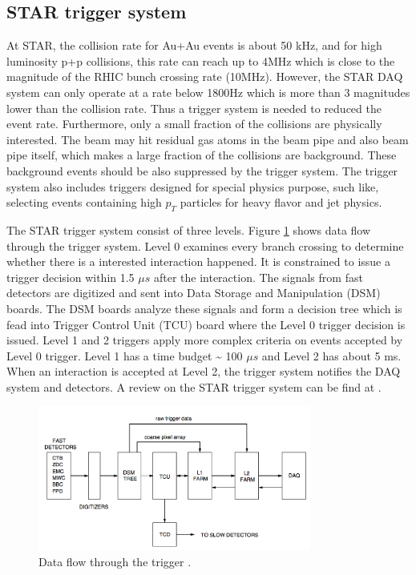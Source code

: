 \subsection{STAR trigger system}

At STAR, the collision rate for Au+Au events is about 50 kHz, and
for high luminosity p+p collisions, this rate can reach up to 4MHz
which is close to the magnitude of the RHIC bunch crossing rate (10MHz).
However, the STAR DAQ system can only operate at a rate below 1800Hz
which is more than 3 magnitudes lower than the collision rate. Thus
a trigger system is needed to reduced the event rate. Furthermore,
only a small fraction of the collisions are physically interested.
The beam may hit residual gas atoms in the beam pipe and also beam
pipe itself, which makes a large fraction of the collisions are background.
These background events should be also suppressed by the trigger system.
The trigger system also includes triggers designed for special physics
purpose, such like, selecting events containing high $p_{T}$ particles
for heavy flavor and jet physics.

The STAR trigger system consist of three levels. Figure \ref{fig:TriggerDataFlow}
shows data flow through the trigger system. Level 0 examines every
branch crossing to determine whether there is a interested interaction
happened. It is constrained to issue a trigger decision within 1.5
$\mu s$ after the interaction. The signals from fast detectors are
digitized and sent into Data Storage and Manipulation (DSM) boards.
The DSM boards analyze these signals and form a decision tree which
is fead into Trigger Control Unit (TCU) board where the Level 0 trigger
decision is issued. Level 1 and 2 triggers apply more complex criteria
on events accepted by Level 0 trigger. Level 1 has a time budget \textasciitilde{}
100 $\mu s$ and Level 2 has about 5 ms. When an interaction is accepted
at Level 2, the trigger system notifies the DAQ system and detectors.
A review on the STAR trigger system can be find at \cite{Bieser2003766}.

\begin{figure}
\begin{centering}
\includegraphics[width=0.8\textwidth]{fig/2.Detector/TriggerDataFlow}
\par\end{centering}

\protect\caption{Data flow through the trigger \cite{Bieser2003766}.}


\label{fig:TriggerDataFlow}
\end{figure}



